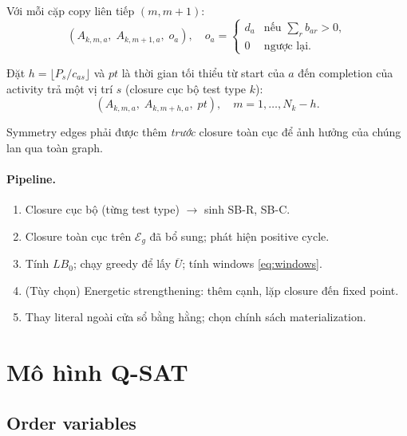 \documentclass[11pt,a4paper]{article}
\theoremstyle{remark}
\begin{document}
\begin{description}[style=nextline]
  \item[SB-R (renewable).] Với mỗi cặp copy liên tiếp $(m, m+1)$:
  \[
    (A_{k,m,a},\; A_{k,m+1,a},\; o_a),\quad
    o_a = \begin{cases} d_a & \text{nếu } \sum_r b_{ar} > 0,\\
      0 & \text{ngược lại.}\end{cases}
  \]

  \item[SB-C (storage).] Đặt $h = \lfloor P_s / c_{as} \rfloor$ và $pt$ là
  thời gian tối thiểu từ start của $a$ đến completion của activity trả một vị
  trí $s$ (closure cục bộ test type $k$):
  \[
    (A_{k,m,a},\; A_{k,m+h,a},\; pt),\quad m = 1, \ldots, N_k - h.
  \]
\end{description}

Symmetry edges phải được thêm \emph{trước} closure toàn cục để ảnh hưởng
của chúng lan qua toàn graph.

\paragraph{Pipeline.}
\begin{enumerate}
  \item Closure cục bộ (từng test type) $\to$ sinh SB-R, SB-C.
  \item Closure toàn cục trên $\mathcal{E}_g$ đã bổ sung; phát hiện positive cycle.
  \item Tính $LB_0$; chạy greedy để lấy $\overline{U}$; tính windows \eqref{eq:windows}.
  \item (Tùy chọn) Energetic strengthening: thêm cạnh, lặp closure đến fixed point.
  \item Thay literal ngoài cửa sổ bằng hằng; chọn chính sách materialization.
\end{enumerate}

\section{Mô hình Q-SAT}
\label{sec:qsat}

\subsection{Order variables}
\end{document}

